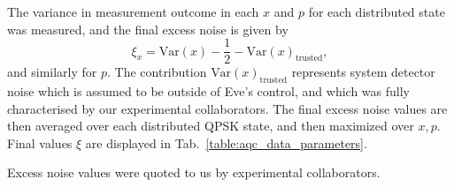 The variance in measurement outcome in each $x$ and $p$ for each distributed state was measured, and the final excess noise is given by
\begin{equation}
\xi_{x} = \text{Var}\left(x\right) - \frac{1}{2} - \text{Var}\left(x\right)_{\text{trusted}},
\end{equation} %
and similarly for $p$. The contribution $\text{Var}\left(x\right)_{\text{trusted}}$ represents system detector noise which is assumed to be outside of Eve's control, and which was fully characterised by our experimental collaborators. The final excess noise values are then averaged over each distributed QPSK state, and then maximized over $x, p$. Final values $\xi$ are displayed in Tab.~\ref{table:aqc_data_parameters}.

 Excess noise values were quoted to us by experimental collaborators.



